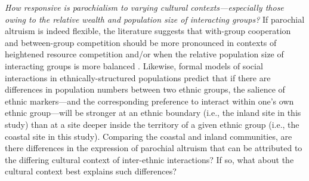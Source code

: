 \documentclass[bibauthoryear]{aa}
\begin{document}
\begin{enumerate*}[label={Q(\arabic*)},font={\color{blue!50!black}\bfseries}]
\item \label{q2} \emph{How responsive is  parochialism to varying cultural contexts---especially those owing to the relative wealth and population size of interacting groups?} If parochial altruism is indeed flexible, the literature suggests that with-group cooperation and between-group competition should be more pronounced in contexts of heightened resource competition \citep{bellmoya} and/or when the  relative population size of interacting groups is more balanced \citep{advani2015melting}. Likewise, formal models of social interactions in ethnically-structured populations \citep{mcelreath2003shared, bunce2018sustainability} predict that if there are differences in population numbers between two ethnic groups, the salience of ethnic markers---and the corresponding preference to interact within one's own ethnic group---will be stronger at an ethnic boundary (i.e., the inland site in this study) than at a site deeper inside the territory of a given ethnic group (i.e., the coastal site in this study). %
 Comparing the coastal and inland communities, are there differences in the expression of parochial altruism that can be attributed to the differing cultural context of inter-ethnic interactions? If so, what about the cultural context best explains such differences?\\
 \indent
 

\end{enumerate*}
\end{document}
